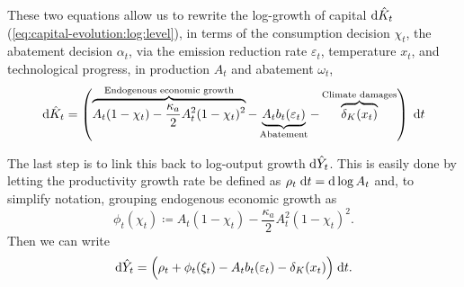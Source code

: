 \documentclass[../../main.tex]{subfiles}
\begin{document}
These two equations allow us to rewrite the log-growth of capital $\mathrm{d}\hat K_t$ (\ref{eq:capital-evolution:log:level}), in terms of the consumption decision $\chi_t$, the abatement decision $\alpha_t$, via the emission reduction rate $\varepsilon_t$, temperature $x_t$, and technological progress, in production $A_t$ and abatement $\omega_t$, \begin{equation} \label{eq:capital-evolution:log:growth}
    \mathrm{d}\hat K_t = \left( \overbrace{A_t (1 - \chi_t) - \frac{\kappa_a}{2} A^2_t (1 - \chi_t)^2}^{\text{Endogenous economic growth}} - \underbrace{A_t b_t(\varepsilon_t)}_{\text{Abatement}} - \overbrace{\delta_K(x_t)}^{\text{Climate damages}} \right) \; \mathrm{d}t
\end{equation} 

The last step is to link this back to log-output growth $\mathrm{d}\hat Y_t$. This is easily done by letting the productivity growth rate be defined as $\rho_t \; \mathrm{d}t = \mathrm{d}\log A_t$ and, to simplify notation, grouping endogenous economic growth as \begin{equation}
    \phi_t(\chi_t) \coloneqq A_t (1 - \chi_t) - \frac{\kappa_a}{2} A^2_t (1 - \chi_t)^2.
\end{equation} Then we can write \begin{equation} \label{eq:output-evolution:log}
    \mathrm{d}\hat Y_t = \Big(\rho_t + \phi_t(\xi_t) - A_t b_t(\varepsilon_t) - \delta_K(x_t) \Big) \; \mathrm{d}t.
\end{equation}
\end{document}
